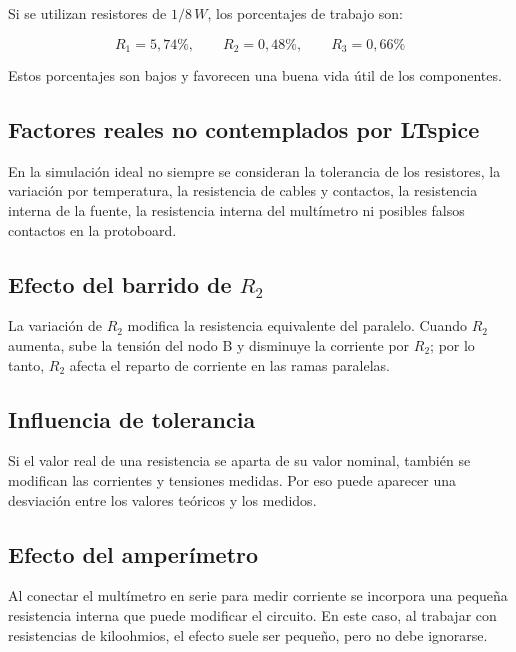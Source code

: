 \documentclass[a4paper,12pt]{article}
\begin{document}
	Si se utilizan resistores de $1/8\,W$, los porcentajes de trabajo son:
	
	\[
	R_1 = 5,74\%, \qquad R_2 = 0,48\%, \qquad R_3 = 0,66\%
	\]
	
	Estos porcentajes son bajos y favorecen una buena vida útil de los componentes.
	
	\subsection*{Factores reales no contemplados por LTspice}
	
	En la simulación ideal no siempre se consideran la tolerancia de los resistores, la variación por
	temperatura, la resistencia de cables y contactos, la resistencia interna de la fuente, la resistencia
	interna del multímetro ni posibles falsos contactos en la protoboard.
	
	\subsection*{Efecto del barrido de $R_2$}
	
	La variación de $R_2$ modifica la resistencia equivalente del paralelo. Cuando $R_2$ aumenta, sube
	la tensión del nodo B y disminuye la corriente por $R_2$; por lo tanto, $R_2$ afecta el reparto de
	corriente en las ramas paralelas.
	
	\subsection*{Influencia de tolerancia}
	
	Si el valor real de una resistencia se aparta de su valor nominal, también se modifican las corrientes
	y tensiones medidas. Por eso puede aparecer una desviación entre los valores teóricos y los medidos.
	
	\subsection*{Efecto del amperímetro}
	
	Al conectar el multímetro en serie para medir corriente se incorpora una pequeña resistencia interna
	que puede modificar el circuito. En este caso, al trabajar con resistencias de kiloohmios, el efecto
	suele ser pequeño, pero no debe ignorarse.
	
\end{document}
